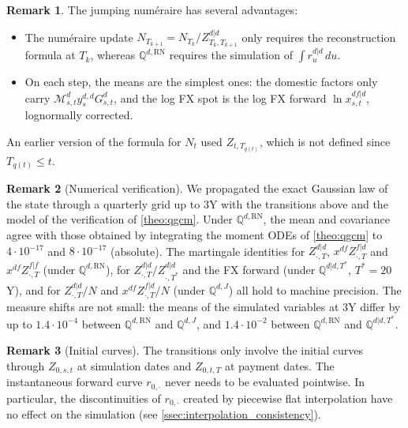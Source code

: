 \documentclass[11pt,english]{amsart}
\newcommand{\RN}{\mathrm{RN}}
\newcommand{\QQ}{\mathbb{Q}}
\theoremstyle{definition}
\newtheorem{rema}{Remark}
\begin{document}
\begin{rema}
The jumping num\'eraire has several advantages:
\begin{itemize}
\item The num\'eraire update $N_{T_{k+1}} = N_{T_k}/Z^{d|d}_{T_k,T_{k+1}}$ only requires the reconstruction formula at $T_k$, whereas $\QQ^{d,\RN}$ requires the simulation of $\int r^{d|d}_u\,du$.
\item On each step, the means are the simplest ones: the domestic factors only carry $\mathcal{M}^d_{s,t}y^{d,d}_sG^d_{s,t}$, and the log FX spot is the log FX forward $\ln x^{df|d}_{s,t}$, lognormally corrected.
\end{itemize}
An earlier version of the formula for $N_t$ used $Z_{t,T_{q(t)}}$, which is not defined since $T_{q(t)}\le t$.
\end{rema}

\begin{rema}[Numerical verification]
We propagated the exact Gaussian law of the state through a quarterly grid up to $3$Y with the transitions above and the model of the verification of \autoref{theo:qgcm}. Under $\QQ^{d,\RN}$, the mean and covariance agree with those obtained by integrating the moment ODEs of \autoref{theo:qgcm} to $4\cdot 10^{-17}$ and $8\cdot 10^{-17}$ (absolute). The martingale identities for $Z^{d|d}_{\cdot,T}$, $x^{df}Z^{f|d}_{\cdot,T}$ and $x^{df}Z^{f|f}_{\cdot,T}$ (under $\QQ^{d,\RN}$), for $Z^{d|d}_{\cdot,T}/Z^{d|d}_{\cdot,T^*}$ and the FX forward (under $\QQ^{d|d,T^*}$, $T^* = 20$Y), and for $Z^{d|d}_{\cdot,T}/N$ and $x^{df}Z^{f|d}_{\cdot,T}/N$ (under $\QQ^{d,J}$) all hold to machine precision. The measure shifts are not small: the means of the simulated variables at $3$Y differ by up to $1.4\cdot 10^{-4}$ between $\QQ^{d,\RN}$ and $\QQ^{d,J}$, and $1.4\cdot 10^{-2}$ between $\QQ^{d,\RN}$ and $\QQ^{d|d,T^*}$.
\end{rema}

\begin{rema}[Initial curves]\label{rema:simulation_initial_curves}
The transitions only involve the initial curves through $Z_{0,s,t}$ at simulation dates and $Z_{0,t,T}$ at payment dates. The instantaneous forward curve $r_{0,\cdot}$ never needs to be evaluated pointwise. In particular, the discontinuities of $r_{0,\cdot}$ created by piecewise flat interpolation have no effect on the simulation (see \autoref{ssec:interpolation_consistency}).
\end{rema}
\end{document}
